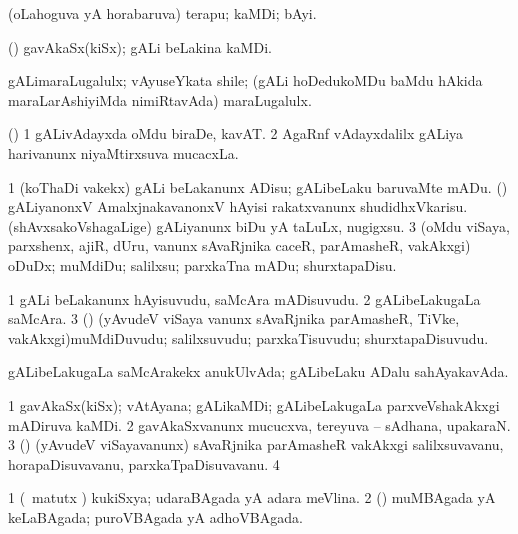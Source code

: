 \bentry
{} 
\gl{\nA}
\expl{}
\bmng
 (oLahoguva yA horabaruva) terapu; kaMDi; bAyi. 
\emng
\eentry

\bentry
{} 
\gl{\nA}
\expl{}
\bmng
 (\vAshi) gavAkaSx(kiSx); gALi beLakina kaMDi. 
\emng
\eentry

\bentry
{} 
\gl{\nA}
\expl{}
\bmng
 gALimaraLugalulx; vAyuseYkata shile; (gALi hoDedukoMDu baMdu hAkida maraLarAshiyiMda nimiRtavAda) maraLugalulx. 
\emng
\eentry

\bentry
{} 
\gl{\nA}
\expl{}
\bmng
 (\saM) 
\bnum
\num{1} gALivAdayxda oMdu biraDe, kavAT. 
\num{2} AgaRnf vAdayxdalilx gALiya harivanunx niyaMtirxsuva mucacxLa. 
\enum
\emng
\eentry

\bentry
{} 
\gl{\sakirx}
\expl{}
\bmng
\bnum
\num{1} (koThaDi \mo vakekx) gALi beLakanunx ADisu; gALibeLaku baruvaMte mADu. 
 (\veYshA) 
\banum
{} gALiyanonxV AmalxjnakavanonxV hAyisi rakatxvanunx shudidhxVkarisu. 
 (shAvxsakoVshagaLige) gALiyanunx biDu yA taLuLx, nugigxsu. 
\eanum
\numie
\num{3} (oMdu viSaya, parxshenx, ajiR, dUru, \mo vanunx sAvaRjnika caceR, parAmasheR, \mo vakAkxgi) oDuDx; muMdiDu; salilxsu; parxkaTna mADu; shurxtapaDisu. 
\enum
\emng
\eentry

\bentry
{} 
\gl{\nA}
\expl{}
\bmng
\bnum
\num{1} gALi beLakanunx hAyisuvudu, saMcAra mADisuvudu. 
\num{2} gALibeLakugaLa saMcAra. 
\num{3} (\rUpa) (yAvudeV viSaya \mo vanunx sAvaRjnika parAmasheR, TiVke, \mo vakAkxgi)muMdiDuvudu; salilxsuvudu; parxkaTisuvudu; shurxtapaDisuvudu. 
\enum
\emng
\eentry

\bentry
{} 
\gl{\gu}
\expl{}
\bmng
 gALibeLakugaLa saMcArakekx anukUlvAda; gALibeLaku ADalu sahAyakavAda. 
\emng
\eentry

\bentry
{} 
\gl{\nA}
\expl{}
\bmng
\bnum
\num{1} gavAkaSx(kiSx); vAtAyana; gALikaMDi; gALibeLakugaLa parxveVshakAkxgi mADiruva kaMDi. 
\num{2} gavAkaSxvanunx mucucxva, tereyuva -- sAdhana, upakaraN. 
\num{3} (\rUpa) (yAvudeV viSayavanunx) sAvaRjnika parAmasheR \mo vakAkxgi salilxsuvavanu, horapaDisuvavanu, parxkaTpaDisuvavanu. 
\num{4}  
\enum
\emng
\eentry

\bentry
{} 
\gl{\gu}
\expl{}
\bmng
\bnum
\num{1} (\pArxvi\ matutx \aMrashA) kukiSxya; udaraBAgada yA adara meVlina. 
\num{2} (\savi) muMBAgada yA keLaBAgada; puroVBAgada yA adhoVBAgada. 
\enum
\emng
\eentry

